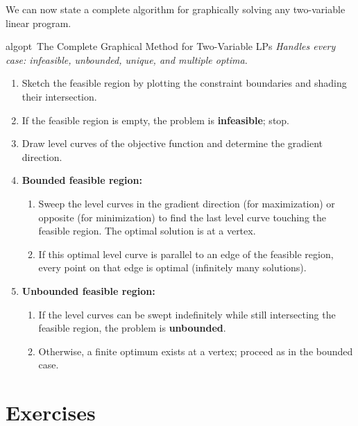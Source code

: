 We can now state a complete algorithm for graphically solving any two-variable linear program.

\begin{stepbox}{algopt}{\ The Complete Graphical Method for Two-Variable LPs}
\emph{Handles every case: infeasible, unbounded, unique, and multiple optima.}
\begin{enumerate}
    \item Sketch the feasible region by plotting the constraint boundaries and shading their intersection.
    \item If the feasible region is empty, the problem is \textbf{infeasible}; stop.
    \item Draw level curves of the objective function and determine the gradient direction.
    \item \textbf{Bounded feasible region:}
    \begin{enumerate}
        \item Sweep the level curves in the gradient direction (for maximization) or opposite (for minimization) to find the last level curve touching the feasible region. The optimal solution is at a vertex.
        \item If this optimal level curve is parallel to an edge of the feasible region, every point on that edge is optimal (infinitely many solutions).
    \end{enumerate}
    \item \textbf{Unbounded feasible region:}
    \begin{enumerate}
        \item If the level curves can be swept indefinitely while still intersecting the feasible region, the problem is \textbf{unbounded}.
        \item Otherwise, a finite optimum exists at a vertex; proceed as in the bounded case.
    \end{enumerate}
\end{enumerate}
\end{stepbox}

\newpage

\section{Exercises}\label{exercises}


